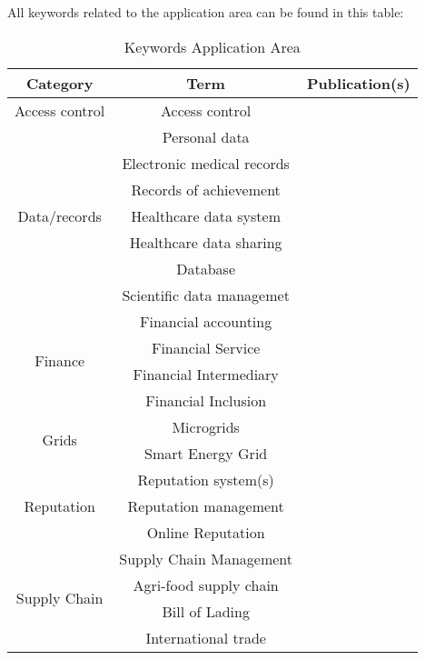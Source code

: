 \clearpage
All keywords related to the application area can be found in this table:
\begin{longtable}{ |c|c|p{4cm}| }
	\caption{Keywords Application Area} \\
	\hline
 	\textbf{Category} & \textbf{Term} & \textbf{Publication(s)} \\ [0.5ex] 
 	\hline\hline
 	Access control & Access control & \cite{2016_Azaria,2017_Ouaddah}\\ 
	 \hline
	 \multirow{7}{*}{Data/records} & Personal data & \cite{2015_Zyskind} \\  \cline{2-3}
	 & Electronic medical records & \cite{2016_Azaria} \\ \cline{2-3}
	 & Records of achievement & \cite{2016_Sharples} \\ \cline{2-3}
	 & Healthcare data system & \multirow{2}{*}{\cite{2016_Yue}} \\ \cline{2-2}
	 & Healthcare data sharing & \\ \cline{2-3}
	 & Database & \cite{2017_Coyne} \\ \cline{2-3}
	 & Scientific data managemet & \cite{2017_Gipp} \\
	 \hline
	 \multirow{4}{*}{Finance} & Financial accounting & \cite{2017_Coyne} \\ \cline{2-3}
	 & Financial Service & \multirow{3}{*}{\cite{2017_Jaag}} \\ \cline{2-2}
	 & Financial Intermediary &  \\ \cline{2-2}
	 & Financial Inclusion &  \\
	 \hline
	 \multirow{2}{*}{Grids} & Microgrids & \cite{2016_Kianmajd} \\ \cline{2-3}
	 & Smart Energy Grid & \cite{2018_Alessandra} \\
	 \hline
	 \multirow{3}{*}{Reputation} & Reputation system(s) & \cite{2015_Dennis,2016_Schaub} \\ \cline{2-3}
	 & Reputation management & \cite{2016_Sharples} \\ \cline{2-3}
	 & Online Reputation & \cite{2016_Yasin} \\
	 \hline
	 \multirow{4}{*}{Supply Chain} & Supply Chain Management & \cite{2017_Madhwal}\\ \cline{2-3}
	 & Agri-food supply chain & \cite{2016_Tian} \\ \cline{2-3}
	 & Bill of Lading & \multirow{2}{*}{\cite{2017_Naerland}} \\ \cline{2-2}
	 & International trade & \\
	 \hline

\end{longtable}
